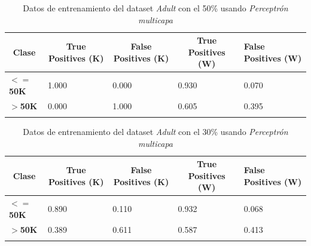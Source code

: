\documentclass[10pt,a4paper]{article}
\begin{document}
\begin{table}[h!]
\begin{tabular}{lllll}
\hline
\multicolumn{1}{|c|}{\textbf{Clase}} & \multicolumn{1}{c|}{\textbf{True Positives (K)}} & \multicolumn{1}{c|}{\textbf{False Positives (K)}} & \multicolumn{1}{c|}{\textbf{True Positives (W)}} & \multicolumn{1}{l|}{\textbf{False Positives (W)}} \\ \hline
\multicolumn{1}{|l|}{\textbf{$<=$50K}} & \multicolumn{1}{l|}{1.000}          & \multicolumn{1}{l|}{0.000}          & \multicolumn{1}{l|}{0.930}          & \multicolumn{1}{l|}{0.070} \\ \hline
\multicolumn{1}{|l|}{\textbf{$>$50K}} & \multicolumn{1}{l|}{0.000}          & \multicolumn{1}{l|}{1.000}          & \multicolumn{1}{l|}{0.605}          & \multicolumn{1}{l|}{0.395} \\ \hline
\textbf{}                       &                                &                                &                                &                      
\end{tabular}
\caption{Datos de entrenamiento del dataset \emph{Adult} con el 50\% usando \emph{Perceptrón multicapa}}
\label{tab:adult_perceptron_50}
\end{table}

\begin{table}[h!]
\begin{tabular}{lllll}
\hline
\multicolumn{1}{|c|}{\textbf{Clase}} & \multicolumn{1}{c|}{\textbf{True Positives (K)}} & \multicolumn{1}{c|}{\textbf{False Positives (K)}} & \multicolumn{1}{c|}{\textbf{True Positives (W)}} & \multicolumn{1}{l|}{\textbf{False Positives (W)}} \\ \hline
\multicolumn{1}{|l|}{\textbf{$<=$50K}} & \multicolumn{1}{l|}{0.890}          & \multicolumn{1}{l|}{0.110}          & \multicolumn{1}{l|}{0.932}          & \multicolumn{1}{l|}{0.068} \\ \hline
\multicolumn{1}{|l|}{\textbf{$>$50K}} & \multicolumn{1}{l|}{0.389}          & \multicolumn{1}{l|}{0.611}          & \multicolumn{1}{l|}{0.587}          & \multicolumn{1}{l|}{0.413} \\ \hline
\textbf{}                       &                                &                                &                                &                      
\end{tabular}
\caption{Datos de entrenamiento del dataset \emph{Adult} con el 30\% usando \emph{Perceptrón multicapa}}
\label{tab:adult_perceptron_30}
\end{table}
\end{document}
